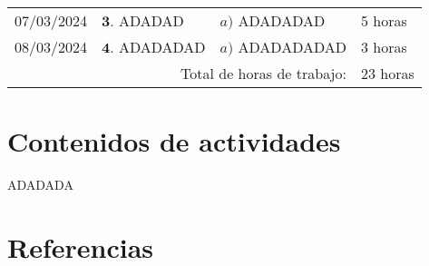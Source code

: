 \documentclass[12pt]{article}
\begin{document}
\hfill\\
\begin{minipage}[h]{\textwidth}
	\centering
	\begin{tabularx}{\textwidth}{|p{2cm}|X|X|p{2cm}|} 
		\hline		
		
	 	07/03/2024 & 
	 	$\mathbf{3}.$ ADADAD & 
	 	$a)$ ADADADAD \newline & 
	 	5 horas \\
	 	08/03/2024 & 
	 	$\mathbf{4}.$ ADADADAD &
	 	$a)$ ADADADADAD \newline & 
	 	3 horas \\
	 	
	 	\hline
		\multicolumn{3}{|r|}{Total de horas de trabajo:} & 23 horas \\ 
	 	\hline                 
	\end{tabularx}
\end{minipage}




\section*{Contenidos de actividades}

ADADADA






\newpage

\section*{Referencias}
\renewcommand\refname{}


\end{document}
